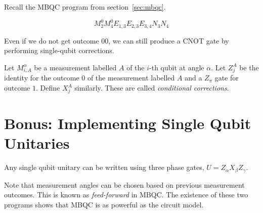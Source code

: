 \documentclass{article}
\begin{document}
Recall the MBQC program from section~\ref{sec:mbqc}.

\[ M_2^0 M_4^0 E_{1,3} E_{2,3} E_{3,4} N_3 N_4 \]

\medskip
{}
\medskip

Even if we do not get outcome $00$, we can still produce a CNOT gate by performing single-qubit corrections.

\medskip
{}
\medskip

Let $M_{i,A}^\alpha$ be a measurement labelled $A$ of the $i$-th qubit at angle $\alpha$. Let $Z_j^A$ be the identity for the outcome $0$ of the measurement labelled $A$ and a $Z_\pi$ gate for outcome $1$. Define $X_j^A$ similarly. These are called \textit{conditional corrections}.

\medskip
{}
\medskip

\section*{Bonus: Implementing Single Qubit Unitaries}

Any single qubit unitary can be written using three phase gates, $U = Z_\alpha X_\beta Z_\gamma$.

\medskip
{}
\medskip

Note that measurement angles can be chosen based on previous measurement outcomes. This is known as \textit{feed-forward} in MBQC. The existence of these two programs shows that MBQC is as powerful as the circuit model.
\end{document}
